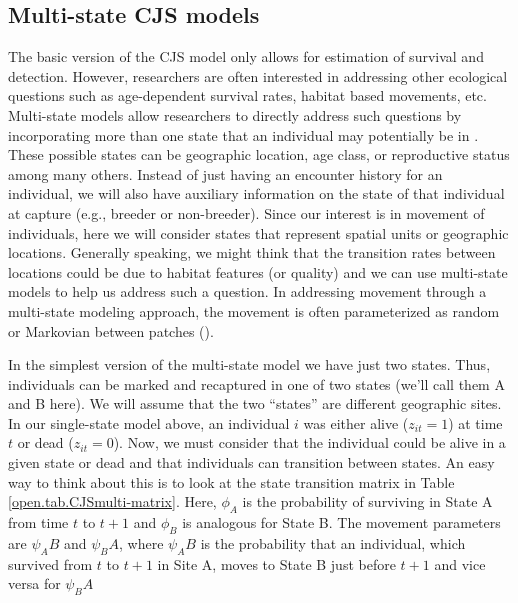 \subsection{Multi-state CJS models}

The basic version of the CJS model only allows for estimation of survival and detection.  However,
researchers are often interested in addressing other ecological questions such as age-dependent
survival rates, habitat based movements, etc.  Multi-state models allow researchers to directly
address such questions by incorporating more than one state that an individual may potentially
be in \cite{arnason:1972,arnason:1973, brownie_etal:1993}.  These possible states can be geographic
location, age class, or reproductive status among many
others.  Instead of just having an encounter history for an individual, we will also have auxiliary
information on the state of that individual at capture (e.g., breeder or non-breeder).
Since our interest is in movement of individuals, here we will consider states that represent spatial units or
geographic locations.  Generally speaking, we might think that the transition rates between locations could be due to
habitat features (or quality) and we can use multi-state models to help us address such a question.
In addressing movement through a multi-state modeling approach, the movement is often parameterized
as random or Markovian between patches (\cite{arnason:1972,arnason:1973, schwarz_etal:1993}).

In the simplest version of the multi-state model we have just two states.  Thus, individuals
can be marked and recaptured in one of two states (we'll call them A and B here).
We will assume that the two ``states'' are different
geographic sites.
In our single-state model above, an individual $i$ was either alive ($z_{it}=1$) at time $t$
or dead ($z_{it}=0$).  Now, we must consider that the individual could be alive in a given state or
dead and that individuals can transition between states.  An easy way to think about this is to look at
the state transition matrix in Table \ref{open.tab.CJSmulti-matrix}.
Here, $\phi_A$ %
is the probability of surviving
in State A from time $t$ to $t+1$ and $\phi_B$ is analogous for State B.  The
movement parameters are $\psi_AB$ and $\psi_BA$,
where $\psi_AB$ is the probability that an individual, which survived
from $t$ to $t+1$ in Site A, moves to State B just
before $t+1$ and vice versa for $\psi_BA$


